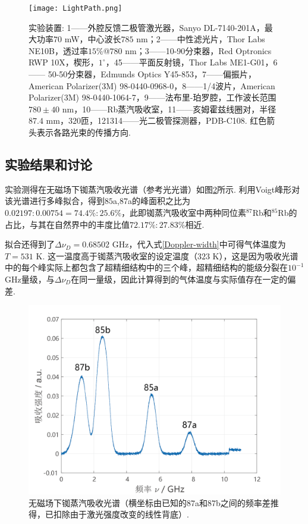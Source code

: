 \documentclass[UTF8,a4paper,10pt]{article}
\begin{document}
\begin{figure}[ht]
    \centering
    \texttt{[image: LightPath.png]}
    \caption{实验装置: \textcircled{\footnotesize{1}}——外腔反馈二极管激光器，Sanyo DL-7140-201A，最大功率$70$ mW，中心波长$785$ nm；\textcircled{\footnotesize{2}}——中性滤光片，Thor Labs NE10B，透过率$15\%$@$780$ nm；\textcircled{\footnotesize{3}}——10-90分束器，Red Optronics RWP 10X，楔形，$1^{\circ}$，\textcircled{\footnotesize{4}}\textcircled{\footnotesize{5}}——平面反射镜，Thor Labs ME1-G01，\textcircled{\footnotesize{6}} —— 50-50分束器，Edmunds Optics Y45-853，\textcircled{\footnotesize{7}}——偏振片，American Polarizer(3M) 98-0440-0968-0，\textcircled{\footnotesize{8}}——1/4波片，American Polarizer(3M) 98-0440-1064-7，\textcircled{\footnotesize{9}}——法布里-珀罗腔，工作波长范围$780\pm 40$ nm，\textcircled{\scriptsize{10}}——Rb蒸汽吸收室，\textcircled{\scriptsize{11}}——亥姆霍兹线圈对，半径$87.4$ mm，$320$匝，\textcircled{\scriptsize{12}}\textcircled{\scriptsize{13}}\textcircled{\scriptsize{14}}——光二极管探测器，PDB-C108. 红色箭头表示各路光束的传播方向.}
    \label{light-path}
\end{figure}

\subsection{实验结果和讨论}

实验测得在无磁场下铷蒸汽吸收光谱（参考光光谱）如图\ref{Absorption-noField}所示. 利用Voigt峰形对该光谱进行多峰拟合，得到$85$a,$87$a的峰面积之比为$0.02197:0.00754=74.4\%:25.6\%$，此即铷蒸汽吸收室中两种同位素$^{87}$Rb和$^{85}$Rb的占比，与其在自然界中的丰度比值$72.17\%:27.83\%$相近.

拟合还得到了$\Delta\nu_D=0.68502$ GHz，代入式\eqref{Doppler-width}中可得气体温度为$T=531$ K. 这一温度高于铷蒸汽吸收室的设定温度（$323$ K），这是因为吸收光谱中的每个峰实际上都包含了超精细结构中的三个峰，超精细结构的能级分裂在$10^{-1}$ GHz量级，与$\Delta\nu_D$在同一量级，因此计算得到的气体温度与实际值存在一定的偏差.

\begin{figure}[h]
    \centering
    \includegraphics[width=.5\textwidth]{Absorption-noField.png}
    \caption{无磁场下铷蒸汽吸收光谱（横坐标由已知的$87$a和$87$b之间的频率差推得，已扣除由于激光强度改变的线性背底）.}
    \label{Absorption-noField}
\end{figure}
\end{document}
